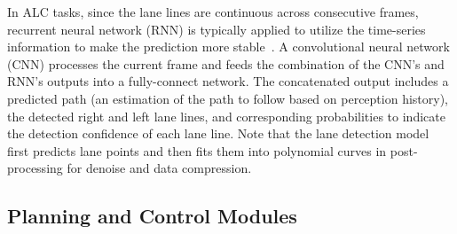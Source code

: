 In ALC tasks, since the lane lines are continuous across consecutive frames, recurrent neural network (RNN) is typically applied to utilize the time-series information to make the prediction more stable~\cite{zou2019robust}. 
A convolutional neural network (CNN) processes the current frame and  feeds the combination of the CNN's and RNN's outputs into a fully-connect network. The concatenated output includes a predicted path (an estimation of the path to follow based on perception history), the detected right and left lane lines, and corresponding probabilities to indicate the detection confidence of each lane line. Note that the lane detection model first predicts lane points and then fits them into polynomial curves in post-processing for denoise and data compression.



\subsection{Planning and Control Modules}

